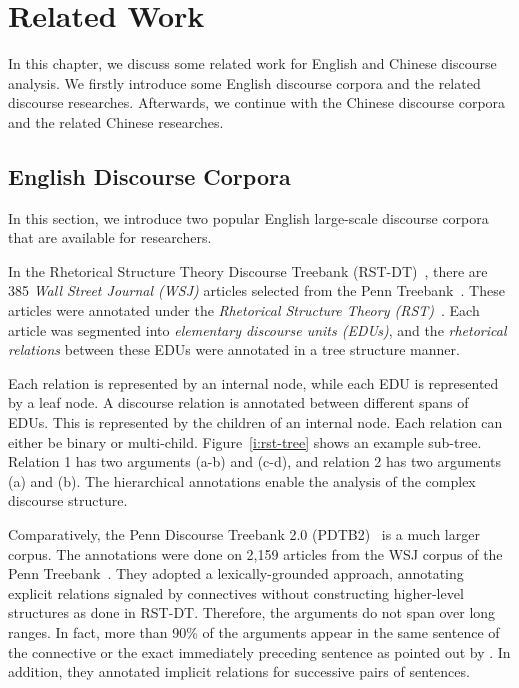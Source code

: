 %
%
%
\chapter{Related Work}
\label{c:related}

In this chapter, we discuss some related work for English and Chinese discourse
analysis. We firstly introduce some English discourse corpora and the
related discourse researches. Afterwards, we continue with the Chinese
discourse corpora and the related Chinese researches.

\section{English Discourse Corpora}

In this section, we introduce two popular English large-scale discourse
corpora that are available for researchers.

In the Rhetorical Structure Theory Discourse Treebank (RST-DT)~\citep{Carlson01building},
there are 385 \textit{Wall Street Journal (WSJ)} articles selected from
the Penn Treebank~\citep{marcus1993building}. These articles were annotated under
the \textit{Rhetorical Structure Theory (RST)}~\citep{mann-thompson88}.
Each article was segmented into \textit{elementary discourse units (EDUs)}, and the
\textit{rhetorical relations} between these EDUs were annotated in a tree structure
manner.

Each relation is represented by an internal node, while each EDU is represented
by a leaf node. A discourse relation is annotated between different spans of EDUs.
This is represented by the children of an internal node. Each relation can
either be binary or multi-child. Figure~\ref{i:rst-tree} shows an example sub-tree.
Relation 1 has two arguments (a-b) and (c-d), and relation 2 has two
arguments (a) and (b).
The hierarchical annotations enable the analysis of the complex discourse structure.



Comparatively, the Penn Discourse Treebank 2.0 (PDTB2)~\citep{Prasad08thepenn}
is a much larger corpus. The annotations were done on 2,159 articles from
the WSJ corpus of the Penn Treebank~\citep{marcus1993building}. They adopted a lexically-grounded
approach, annotating explicit relations signaled by connectives without constructing higher-level
structures as done in RST-DT. Therefore, the arguments do not span over long ranges. In fact,
more than 90\% of the arguments appear in the same sentence of the connective or the
exact immediately preceding sentence as pointed out by \cite{kong2014a}.
In addition, they annotated implicit relations for successive pairs of sentences.


